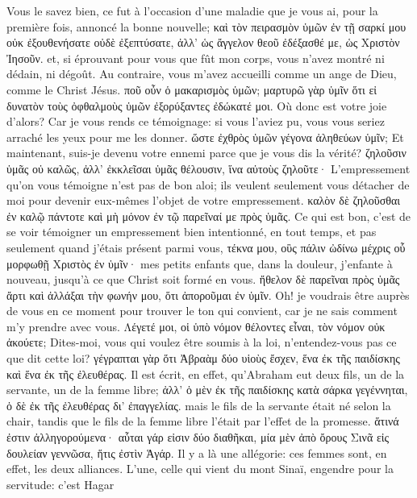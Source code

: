 \documentclass[14pt,a4paper,twoside]{extarticle}
\begin{document}
\begin{paracol}[1]
  {Vous le savez bien, ce fut à l’occasion d’une maladie que je vous ai, pour la première fois, annoncé la bonne nouvelle;}
  \verset
  {καὶ τὸν πειρασμὸν ὑμῶν ἐν τῇ σαρκί μου οὐκ ἐξουθενήσατε οὐδὲ ἐξεπτύσατε, ἀλλ’ ὡς ἄγγελον θεοῦ ἐδέξασθέ με, ὡς Χριστὸν Ἰησοῦν.}
  {et, si éprouvant pour vous que fût mon corps, vous n’avez montré ni dédain, ni dégoût. Au contraire, vous m’avez accueilli comme un ange de Dieu, comme le Christ Jésus.}
  \verset
  {ποῦ οὖν ὁ μακαρισμὸς ὑμῶν; μαρτυρῶ γὰρ ὑμῖν ὅτι εἰ δυνατὸν τοὺς ὀφθαλμοὺς ὑμῶν ἐξορύξαντες ἐδώκατέ μοι.}
  {Où donc est votre joie d’alors? Car je vous rends ce témoignage: si vous l’aviez pu, vous vous seriez arraché les yeux pour me les donner.}
  \verset
  {ὥστε ἐχθρὸς ὑμῶν γέγονα ἀληθεύων ὑμῖν;}
  {Et maintenant, suis-je devenu votre ennemi parce que je vous dis la vérité?}
  \verset
  {ζηλοῦσιν ὑμᾶς οὐ καλῶς, ἀλλ’ ἐκκλεῖσαι ὑμᾶς θέλουσιν, ἵνα αὐτοὺς ζηλοῦτε·}
  {L’empressement qu’on vous témoigne n’est pas de bon aloi; ils veulent seulement vous détacher de moi pour devenir eux-mêmes l’objet de votre empressement.}
  \verset
  {καλὸν δὲ ζηλοῦσθαι ἐν καλῷ πάντοτε καὶ μὴ μόνον ἐν τῷ παρεῖναί με πρὸς ὑμᾶς.}
  {Ce qui est bon, c’est de se voir témoigner un empressement bien intentionné, en tout temps, et pas seulement quand j’étais présent parmi vous,}
  \verset
  {τέκνα μου, οὓς πάλιν ὠδίνω μέχρις οὗ μορφωθῇ Χριστὸς ἐν ὑμῖν·}
  {mes petits enfants que, dans la douleur, j’enfante à nouveau, jusqu’à ce que Christ soit formé en vous.}
  \verset
  {ἤθελον δὲ παρεῖναι πρὸς ὑμᾶς ἄρτι καὶ ἀλλάξαι τὴν φωνήν μου, ὅτι ἀποροῦμαι ἐν ὑμῖν.}
  {Oh! je voudrais être auprès de vous en ce moment pour trouver le ton qui convient, car je ne sais comment m’y prendre avec vous.}
  \verset
  {Λέγετέ μοι, οἱ ὑπὸ νόμον θέλοντες εἶναι, τὸν νόμον οὐκ ἀκούετε;}
  {Dites-moi, vous qui voulez être soumis à la loi, n’entendez-vous pas ce que dit cette loi?}
  \verset
  {γέγραπται γὰρ ὅτι Ἀβραὰμ δύο υἱοὺς ἔσχεν, ἕνα ἐκ τῆς παιδίσκης καὶ ἕνα ἐκ τῆς ἐλευθέρας.}
  {Il est écrit, en effet, qu’Abraham eut deux fils, un de la servante, un de la femme libre;}
  \verset
  {ἀλλ’ ὁ μὲν ἐκ τῆς παιδίσκης κατὰ σάρκα γεγέννηται, ὁ δὲ ἐκ τῆς ἐλευθέρας δι’ ἐπαγγελίας.}
  {mais le fils de la servante était né selon la chair, tandis que le fils de la femme libre l’était par l’effet de la promesse.}
  \verset
  {ἅτινά ἐστιν ἀλληγορούμενα· αὗται γάρ εἰσιν δύο διαθῆκαι, μία μὲν ἀπὸ ὄρους Σινᾶ εἰς δουλείαν γεννῶσα, ἥτις ἐστὶν Ἁγάρ.}
  {Il y a là une allégorie: ces femmes sont, en effet, les deux alliances. L’une, celle qui vient du mont Sinaï, engendre pour la servitude: c’est Hagar}

\end{paracol}
\end{document}

